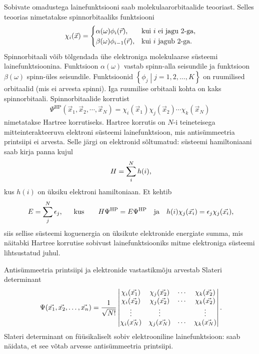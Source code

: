 \documentclass[12pt]{report}
\def\cparen#1{\left\{#1\right\}}
\begin{document}
Sobivate omadustega lainefunktsiooni saab molekulaarorbitaalide teooriast.
Selles teoorias nimetatakse spinnorbitaaliks funktsiooni
\begin{align}\label{eq:spinorb}
    \chi_i(\vec{x}) = \begin{cases}
        \alpha(\omega) \phi_i(\vec{r})\text{,} & \text{kui \(i\) ei jagu \(2\)-ga} \rlap{,}\\
        \beta(\omega) \phi_{i-1}(\vec{r})\text{,} & \text{kui \(i\) jagub \(2\)-ga} \rlap{.} \\
    \end{cases}
\end{align}
Spinnorbitaali võib tõlgendada ühe elektroniga molekulaarse süsteemi lainefunktsioonina.
Funktsioon \(\alpha(\omega)\) vastab spinn-alla seisundile ja funktsioon \(\beta(\omega)\) spinn-üles seisundile.
Funktsioonid \(\cparen{\phi_j \middle| j = 1,2, \ldots, K}\) on ruumilised orbitaalid (mis ei arvesta spinni).
Iga ruumilise orbitaali kohta on kaks spinn\-orbitaali.
Spinnorbitaalide korrutist
\begin{align}
    \Psi^\text{HP}(\vec{x}_1, \vec{x}_2, \cdots, \vec{x}_N) =
    \chi_i(\vec{x}_1) \chi_j(\vec{x}_2) \cdots \chi_k(\vec{x}_N)
\end{align}
nimetatakse Hartree korrutiseks.
Hartree korrutis on \(N\)-i teineteisega mitteinterakteeruva elektroni süsteemi lainefunktsioon, mis antisümmeetria printsiipi ei arvesta.
Selle järgi on elektronid sõltumatud: süsteemi hamiltoniaani saab kirja panna kujul
\begin{align}
    H = \sum_i^N h(i) \rlap{,}
\end{align}
kus \(h(i)\) on üksiku elektroni hamiltoniaan.
Et kehtib
\begin{align}
    E = \sum_j^N \epsilon_j \rlap{,}
    \qquad \text{kus} \qquad
    H \Psi^\text{HP} = E \Psi^\text{HP}
    \quad \text{ja} \quad
    h(i) \chi_j(\vec{x_i}) = \epsilon_j \chi_j(\vec{x_i}) \rlap{,}
\end{align}
siis sellise süsteemi koguenergia on üksikute elektronide energiate summa, mis näitabki Hartree korrutise sobivust lainefunktsiooniks mitme elektroniga süsteemi lihtsustatud juhul.

Antisümmeetria printsiipi ja elektronide vastastikmõju arvestab Slateri determinant
\begin{align}\label{eq:slater}
    \Psi(\vec{x_1}, \vec{x_2}, \ldots, \vec{x_n}) =
    \frac{1}{\sqrt{N!}} \begin{vmatrix}
        \chi_i(\vec{x_1}) & \chi_j(\vec{x_2}) & \cdots & \chi_k(\vec{x_2}) \\
        \chi_i(\vec{x_2}) & \chi_j(\vec{x_2}) & \cdots & \chi_k(\vec{x_2}) \\
        \vdots & \vdots & & \vdots \\
        \chi_i(\vec{x_N}) & \chi_j(\vec{x_N}) & \cdots & \chi_k(\vec{x_N}) \\
    \end{vmatrix} \rlap{.}
\end{align}
Slateri determinant on füüsikaliselt sobiv elektrooniline lainefunktsioon: saab näidata, et see võtab arvesse antisümmeetria printsiipi.
\end{document}
